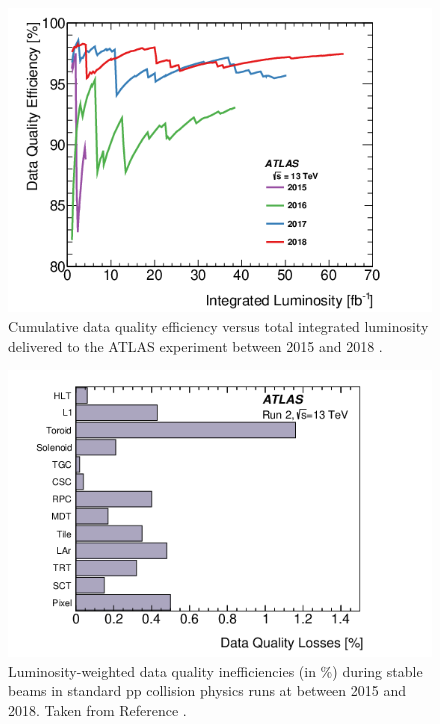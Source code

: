 		\begin{figure}
			\centering
			\includegraphics[width=.75\textwidth,keepaspectratio=true]{appendices/images/ATLAS_DQ_Run2_DQ_Efficiency.png}
			\caption{\label{fig:dq-run2-efficiency} Cumulative data quality efficiency versus total integrated luminosity delivered to the ATLAS experiment between 2015 and 2018 \cite{DQ-Run2}.}
		\end{figure}

		\begin{figure}
			\centering
			\includegraphics[width=.75\textwidth,keepaspectratio=true]{appendices/images/DQ_Inefficiencies.png}
			\caption{\label{fig:dq-run2-inefficiencies} Luminosity-weighted data quality inefficiencies (in \%) during stable beams in standard pp collision physics runs at \sqs between 2015 and 2018. Taken from Reference \cite{DQ-Run2}.}
		\end{figure}


